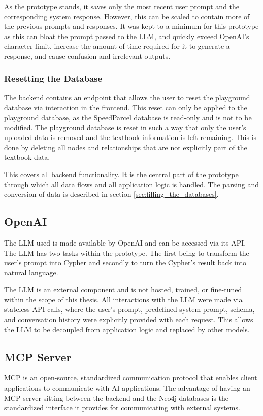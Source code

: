 As the prototype stands, it saves only the most recent user prompt and the corresponding system response. However, this can be scaled to contain more of the previous prompts and responses. It was kept to a minimum for this prototype as this can bloat the prompt passed to the LLM, and quickly exceed OpenAI's character limit, increase the amount of time required for it to generate a response, and cause confusion and irrelevant outputs. \cite{wan2025prompting}

\subsubsection{Resetting the Database}
\label{sub:db_reset}
The backend contains an endpoint that allows the user to reset the playground database via interaction in the frontend. This reset can only be applied to the playground database, as the SpeedParcel database is read-only and is not to be modified. The playground database is reset in such a way that only the user's uploaded data is removed and the textbook information is left remaining. This is done by deleting all nodes and relationships that are not explicitly part of the textbook data.

This covers all backend functionality. It is the central part of the prototype through which all data flows and all application logic is handled. The parsing and conversion of data is described in section \ref{sec:filling_the_databases}.

\subsection{OpenAI}
\label{sub:openai}
The LLM used is made available by OpenAI and can be accessed via its API. \cite{openai_api} The LLM has two tasks within the prototype. The first being to transform the user's prompt into Cypher and secondly to turn the Cypher's result back into natural language.

The LLM is an external component and is not hosted, trained, or fine-tuned within the scope of this thesis. All interactions with the LLM were made via stateless API calls, where the user's prompt, predefined system prompt, schema, and conversation history were explicitly provided with each request. This allows the LLM to be decoupled from application logic and replaced by other models.

\subsection{MCP Server}
\label{sub:mcp}
MCP is an open-source, standardized communication protocol that enables client applications to communicate with AI applications. The advantage of having an MCP server sitting between the backend and the Neo4j databases is the standardized interface it provides for communicating with external systems. \cite{anthropic_mcp_2025, hou2025model}

